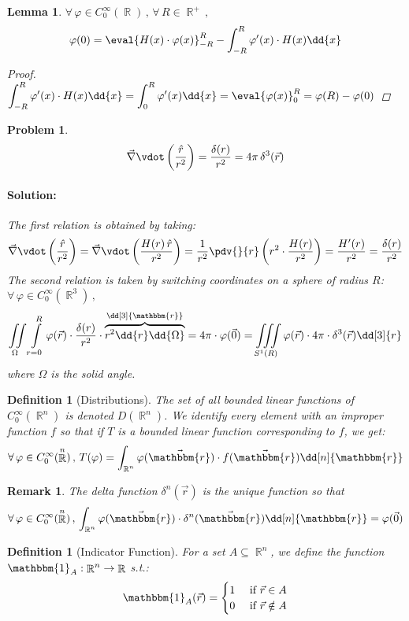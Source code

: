 \documentclass[12pt]{article}
\renewcommand{\div}{\vec{\nabla}\vdot}
\newcommand{\Forall}[1]{\forall\,{#1}\,,\,}
\DeclareMathOperator{\R}{\mathbb{R}}
\newcommand*{\rv}{\vec{r}}
\newcommand*{\rhat}{\hat{r}}
\newcommand*{\ir}{\mathbbm{r}}
\newcommand*{\irv}{\vec{\mathbbm{r}}}
\newcommand*{\ind}{\mathbbm{1}}
\newtheorem{definition}[theorem]{Definition}
\newtheorem{lemma}[theorem]{Lemma}
\newtheorem{remark}[theorem]{Remark}
\newtheorem{problem}[theorem]{Problem}
\newenvironment{solution}{\paragraph{Solution:}}{\hfill}
\begin{document}
\begin{lemma}
  $\Forall{\varphi\in C_0^\infty(\R)}\Forall{R\in\R^+}$
  $$\varphi(0)=\eval{H(x)\cdot\varphi(x)}_{-R}^R-\int_{-R}^R \varphi'(x)\cdot H(x)\dd{x}$$
  \begin{proof}
    $\displaystyle\int_{-R}^R \varphi'(x)\cdot H(x)\dd{x}=\int_0^R \varphi'(x)\dd{x}=\eval{\varphi(x)}_0^R=\varphi(R)-\varphi(0)$
  \end{proof}
\end{lemma}

\begin{problem}
  $$\div\left(\frac{\rhat}{r^2}\right)=\frac{\delta(r)}{r^2}=4\pi\,\delta^3(\rv)$$
  \begin{solution}
    The first relation is obtained by taking: $$\div\left(\frac{\rhat}{r^2}\right)=\div\left(\frac{H(r)\,\rhat}{r^2}\right)=\frac{1}{r^2}\pdv{}{r}\left(r^2\cdot\frac{H(r)}{r^2}\right)=\frac{H'(r)}{r^2}=\frac{\delta(r)}{r^2}$$
    The second relation is taken by switching coordinates on a sphere of radius $R$: $\Forall{\varphi\in C_0^\infty(\R^3)}$ $$\iint\limits_\Omega\int\limits_{r=0}^R\varphi(\rv)\cdot\frac{\delta(r)}{r^2}\cdot \overbrace{r^2\dd{r}\dd{\Omega}}^{\dd[3]{\ir}}=4\pi\cdot\varphi(\vec{0})=\iiint\limits_{S^1(R)} \varphi(\rv)\cdot4\pi\cdot\delta^3(\rv)\dd[3]{r}$$
  where $\Omega$ is the solid angle.
  \end{solution}
\end{problem}

\begin{definition}[Distributions]
  The set of all bounded linear functions of $C_0^\infty(\R^n)$ is denoted $D(\R^n)$. We identify every element with an improper function $f$ so that if $T$ is a bounded linear function corresponding to $f$, we get: $$\Forall{\varphi\in C_0^\infty(\R^n)}T(\varphi)=\int_{\R^n}\varphi(\irv)\cdot f(\irv)\dd[n]{\ir}$$
\end{definition}

\begin{remark}
  The delta function $\delta^n(\rv)$ is the unique function so that $$\Forall{\varphi\in C_0^\infty(\R^n)}\int_{\R^n}\varphi(\irv)\cdot \delta^n(\irv)\dd[n]{\ir}=\varphi(\vec{0})$$
\end{remark}

\begin{definition}[Indicator Function]
  For a set $A\subseteq\R^n$, we define the function $\ind_A:\R^n\to\R$ s.t.: 
  $$\ind_A(\rv)=
  \begin{cases}
    1 &\text{ if }\rv\in A\\
    0 &\text{ if }\rv\notin A\\
  \end{cases}$$
\end{definition}
\end{document}
